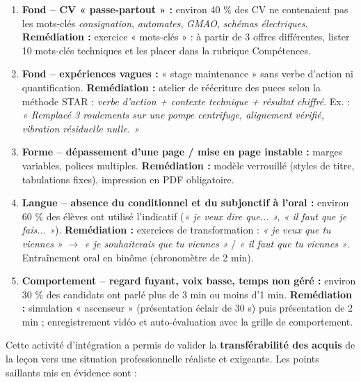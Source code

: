 \documentclass[11pt]{article}
\newcounter{popsec}
\newcounter{popsub}
\newcommand{\courssub}[1]{%
  \stepcounter{popsub}%
  \par\vspace{9pt}\noindent{\popxbold\fontsize{11.5}{13}\selectfont\color{popink}{\color{poporange}\thepopsec.\thepopsub}\hspace{6pt}#1}\par\nopagebreak\vspace{4pt}
}
\begin{document}
\begin{attention}
\begin{enumerate}
    \item \textbf{Fond -- CV « passe-partout » :} environ 40 \% des CV ne contenaient pas les mots-clés \emph{consignation}, \emph{automates}, \emph{GMAO}, \emph{schémas électriques}. \textbf{Remédiation :} exercice « mots-clés » : à partir de 3 offres différentes, lister 10 mots-clés techniques et les placer dans la rubrique Compétences.
    \item \textbf{Fond -- expériences vagues :} « stage maintenance » sans verbe d'action ni quantification. \textbf{Remédiation :} atelier de réécriture des puces selon la méthode STAR : \emph{verbe d'action + contexte technique + résultat chiffré}. Ex. : \emph{« Remplacé 3 roulements sur une pompe centrifuge, alignement vérifié, vibration résiduelle nulle. »}
    \item \textbf{Forme -- dépassement d'une page / mise en page instable :} marges variables, polices multiples. \textbf{Remédiation :} modèle verrouillé (styles de titre, tabulations fixes), impression en PDF obligatoire.
    \item \textbf{Langue -- absence du conditionnel et du subjonctif à l'oral :} environ 60 \% des élèves ont utilisé l'indicatif (\emph{« je veux dire que... », « il faut que je fais... »}). \textbf{Remédiation :} exercices de transformation : \emph{« je veux que tu viennes »} $\rightarrow$ \emph{« je souhaiterais que tu viennes »} / \emph{« il faut que tu viennes »}. Entraînement oral en binôme (chronomètre de 2 min).
    \item \textbf{Comportement -- regard fuyant, voix basse, temps non géré :} environ 30 \% des candidats ont parlé plus de 3 min ou moins d'1 min. \textbf{Remédiation :} simulation « ascenseur » (présentation éclair de 30 s) puis présentation de 2 min ; enregistrement vidéo et auto-évaluation avec la grille de comportement.
\end{enumerate}
\end{attention}

\courssub{Bilan de l'activité}
Cette activité d'intégration a permis de valider la \textbf{transférabilité des acquis} de la leçon vers une situation professionnelle réaliste et exigeante. Les points saillants mis en évidence sont :
\end{document}
